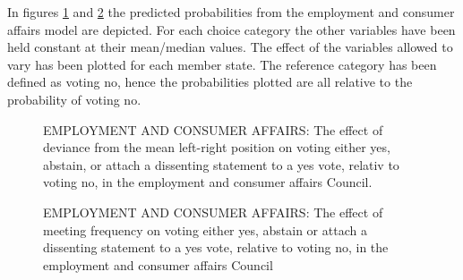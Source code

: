 In figures \ref{fig:devEmplCons} and \ref{fig:meetEmplCons} the predicted probabilities from the employment and consumer affairs model are depicted. For each choice category the other variables have been held constant at their mean/median values. The effect of the variables allowed to vary has been plotted for each member state. The reference category has been defined as voting no, hence the probabilities plotted are all relative to the probability of voting no. 

\begin{figure}[htp]
  \centering
  \scalebox{.7}{
    
  }
\caption{EMPLOYMENT AND CONSUMER AFFAIRS: The effect of deviance from the mean left-right position on voting either yes, abstain, or attach a dissenting statement to a yes vote, relativ to voting no, in the employment and consumer affairs Council.}
\label{fig:devEmplCons}
\end{figure}

\begin{figure}[htp]
  \centering
  \scalebox{.7}{
    
  }
\caption{EMPLOYMENT AND CONSUMER AFFAIRS: The effect of meeting frequency on voting either yes, abstain or attach a dissenting statement to a yes vote, relative to voting no,  in the employment and consumer affairs Council}
\label{fig:meetEmplCons}
\end{figure}

